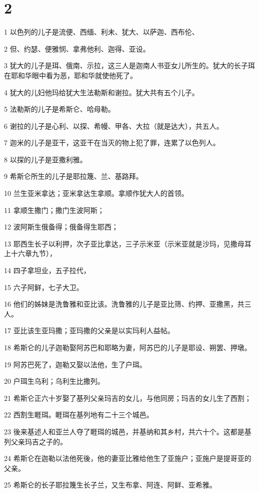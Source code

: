 \chapter{2}

\par 1 以色列的儿子是流便、西缅、利未、犹大、以萨迦、西布伦、
\par 2 但、约瑟、便雅悯、拿弗他利、迦得、亚设。
\par 3 犹大的儿子是珥、俄南、示拉，这三人是迦南人书亚女儿所生的。犹大的长子珥在耶和华眼中看为恶，耶和华就使他死了。
\par 4 犹大的儿妇他玛给犹大生法勒斯和谢拉。犹大共有五个儿子。
\par 5 法勒斯的儿子是希斯仑、哈母勒。
\par 6 谢拉的儿子是心利、以探、希幔、甲各、大拉（就是达大），共五人。
\par 7 迦米的儿子是亚干，这亚干在当灭的物上犯了罪，连累了以色列人。
\par 8 以探的儿子是亚撒利雅。
\par 9 希斯仑所生的儿子是耶拉篾、兰、基路拜。
\par 10 兰生亚米拿达；亚米拿达生拿顺。拿顺作犹大人的首领。
\par 11 拿顺生撒门；撒门生波阿斯；
\par 12 波阿斯生俄备得；俄备得生耶西；
\par 13 耶西生长子以利押，次子亚比拿达，三子示米亚（示米亚就是沙玛，见撒母耳上十六章九节），
\par 14 四子拿坦业，五子拉代，
\par 15 六子阿鲜，七子大卫。
\par 16 他们的姊妹是洗鲁雅和亚比该。洗鲁雅的儿子是亚比筛、约押、亚撒黑，共三人。
\par 17 亚比该生亚玛撒；亚玛撒的父亲是以实玛利人益帖。
\par 18 希斯仑的儿子迦勒娶阿苏巴和耶略为妻，阿苏巴的儿子是耶设、朔罢、押墩。
\par 19 阿苏巴死了，迦勒又娶以法他，生了户珥。
\par 20 户珥生乌利；乌利生比撒列。
\par 21 希斯仑正六十岁娶了基列父亲玛吉的女儿，与他同房；玛吉的女儿生了西割；
\par 22 西割生睚珥。睚珥在基列地有二十三个城邑。
\par 23 後来基述人和亚兰人夺了睚珥的城邑，并基纳和其乡村，共六十个。这都是基列父亲玛吉之子的。
\par 24 希斯仑在迦勒以法他死後，他的妻亚比雅给他生了亚施户；亚施户是提哥亚的父亲。
\par 25 希斯仑的长子耶拉篾生长子兰，又生布拿、阿连、阿鲜、亚希雅。
